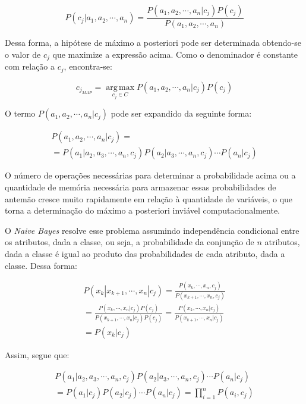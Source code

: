 \documentclass{article}
\begin{document}
\begin{equation}
P(c_j|a_1,a_2,\cdots,a_n) = \frac{P(a_1,a_2,\cdots,a_n|c_j) P(c_j)}{P(a_1,a_2,\cdots,a_n)}
\end{equation}

Dessa forma, a hipótese de máximo a posteriori pode ser determinada obtendo-se o valor de $c_j$ que maximize a expressão acima. Como o denominador é constante com relação a $c_j$, encontra-se:

\begin {equation}
c_{j_{MAP}} = \operatorname*{arg\,max}_{c_j \in C} P(a_1,a_2,\cdots,a_n|c_j) P(c_j)
\end {equation}

O termo $P(a_1,a_2,\cdots,a_n|c_j)$ pode ser expandido da seguinte forma:

\small
\begin {multline}
P(a_1,a_2,\cdots,a_n|c_j) = \\
= P(a_1|a_2,a_3,\cdots,a_n,c_j) P(a_2|a_3,\cdots,a_n,c_j) \cdots P(a_n|c_j)
\end{multline}
\normalsize

O número de operações necessárias para determinar a probabilidade acima ou a quantidade de memória necessária para armazenar essas probabilidades de antemão cresce muito rapidamente em relação à quantidade de variáveis, o que torna a determinação do máximo a posteriori inviável computacionalmente.

O {\it Naive Bayes} resolve esse problema assumindo independência condicional entre os atributos, dada a classe, ou seja, a probabilidade da conjunção de $n$ atributos, dada a classe é igual ao produto das probabilidades de cada atributo, dada a classe. Dessa forma:

\begin{multline}
P(x_k|x_{k+1},\cdots,x_n|c_j) = \frac{P(x_k,\cdots,x_n,c_j)}{P(x_{k+1},\cdots,x_n,c_j)} \\
= \frac{P(x_k,\cdots,x_n|c_j) P(c_j)}{P(x_{k+1},\cdots,x_n|c_j) P(c_j)} = \frac{P(x_k,\cdots,x_n|c_j)}{P(x_{k+1},\cdots,x_n|c_j)} \\
= P(x_k|c_j)
\end{multline}

Assim, segue que:

\small
\begin{multline}
P(a_1|a_2,a_3,\cdots,a_n,c_j) P(a_2|a_3,\cdots,a_n,c_j) \cdots P(a_n|c_j) \\
= P(a_1|c_j) P(a_2|c_j) \cdots P(a_n|c_j) = \prod_{i=1}^n P(a_i,c_j)
\end{multline}
\normalsize
\end{document}
